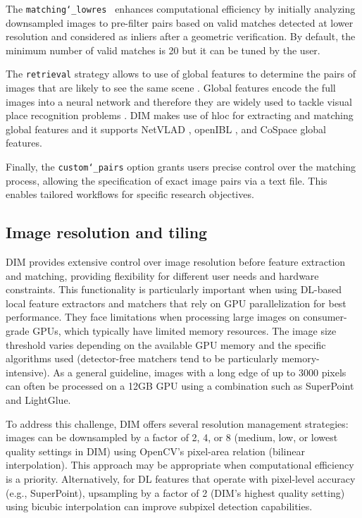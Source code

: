 The \texttt{matching\char`_lowres } enhances computational efficiency by initially analyzing downsampled images to pre-filter pairs based on valid matches detected at lower resolution and considered as inliers after a geometric verification. 
By default, the minimum number of valid matches is 20 but it can be tuned by the user. 

The \texttt{retrieval} strategy allows to use of global features to determine the pairs of images that are likely to see the same scene \citep{Yang2013_imageretrieval}. 
Global features encode the full images into a neural network and therefore they are widely used to tackle visual place recognition problems \citep{napoletano2017visual}. 
DIM makes use of hloc \citep{Sarlin_2019_hloc} for extracting and matching global features and it supports NetVLAD \citep{arandjelovic2016netvlad},  openIBL \citep{ge2020selfsupervising}, and CoSpace \citep{Hong_2019} global features.  

Finally, the \texttt{custom\char`_pairs} option grants users precise control over the matching process, allowing the specification of exact image pairs via a text file. 
This enables tailored workflows for specific research objectives. 

\subsection{Image resolution and tiling}\label{sec:5:tiling}

DIM provides extensive control over image resolution before feature extraction and matching, providing flexibility for different user needs and hardware constraints. 
This functionality is particularly important when using DL-based local feature extractors and matchers that rely on GPU parallelization for best performance. 
They face limitations when processing large images on consumer-grade GPUs, which typically have limited memory resources. 
The image size threshold varies depending on the available GPU memory and the specific algorithms used (detector-free matchers tend to be particularly memory-intensive). 
As a general guideline, images with a long edge of up to 3000 pixels can often be processed on a 12GB GPU using a combination such as SuperPoint and LightGlue. 

To address this challenge, DIM offers several resolution management strategies: images can be downsampled by a factor of 2, 4, or 8 (medium, low, or lowest quality settings in DIM) using OpenCV's pixel-area relation (bilinear interpolation). 
This approach may be appropriate when computational efficiency is a priority. Alternatively, for DL features that operate with pixel-level accuracy (e.g., SuperPoint), upsampling by a factor of 2 (DIM's highest quality setting) using bicubic interpolation can improve subpixel detection capabilities.  

